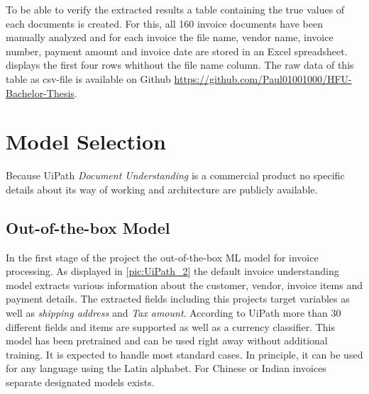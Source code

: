 To be able to verify the extracted results a table containing the true values of each documents is created.
For this, all 160 invoice documents have been manually analyzed and for each invoice the file name, vendor name, invoice number, payment amount and invoice date are stored in an Excel spreadsheet.  displays the first four rows whithout the file name column. The raw data of this table as csv-file is available on Github \url{https://github.com/Paul01001000/HFU-Bachelor-Thesis}. \\

\begin{table}[ht]
    \centering
    \caption{First 4 rows of data verification table}
    \label{tab:db}
\end{table}
\section{Model Selection}
Because UiPath \textit{Document Understanding} is a commercial product no specific details about its way of working and architecture are publicly available.
\subsection*{Out-of-the-box Model}
In the first stage of the project the out-of-the-box \acf{ML} model for invoice processing. As displayed in \cref{pic:UiPath_2} the default invoice understanding model extracts various information about the customer, vendor, invoice items and payment details. The extracted fields including this projects target variables as well as \textit{shipping address} and \textit{Tax amount}. According to UiPath \cite{uipathdoc} more than 30 different fields and items are supported as well as a currency classifier. This model has been pretrained and can be used right away without additional training. It is expected to handle most standard cases. In principle, it can be used for any language using the Latin alphabet. For Chinese or Indian invoices separate designated models exists.
